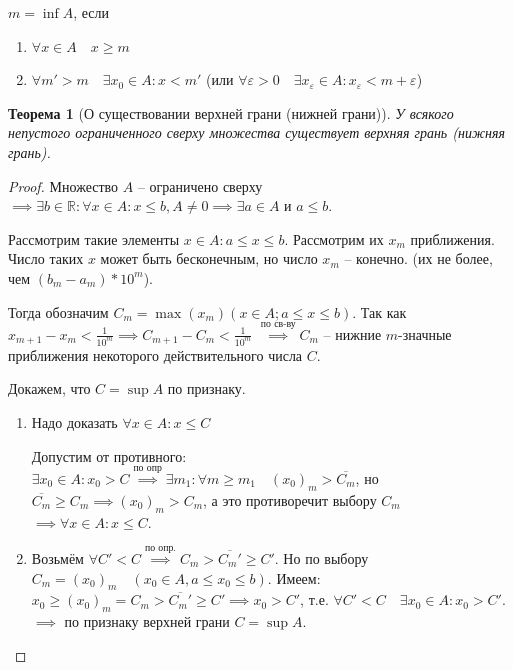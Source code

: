 \documentclass[a4paper,oneside]{article}
\newcommand{\bydef}{\stackrel{\text{по опр.}}{\implies}} %
\newtheorem{theorem}{Теорема}[subsection]
\begin{document}
$m = \inf A$, если 
\begin{enumerate}
    \item $\forall x \in A \quad x \ge m$
    \item $\forall m' > m \quad \exists x_0 \in A: x < m'$
    (или $\forall \varepsilon > 0 \quad \exists x_\varepsilon \in A: x_\varepsilon < m + \varepsilon$)
\end{enumerate}

\begin{theorem}[О существовании верхней грани (нижней грани)]
    У всякого непустого ограниченного сверху множества существует верхняя грань (нижняя грань).
\end{theorem}

\begin{proof}
    Множество $A$ -- ограничено сверху $\implies \exists b \in \mathbb{R}: \forall x \in A:
    x \le b, A \ne 0 \implies \exists a \in A$ и $a \le b$.

    Рассмотрим такие элементы $x \in A: a \le x \le b$. Рассмотрим их $x_m$ приближения.
    Число таких $x$ может быть бесконечным, но число $x_m$ -- конечно.
    (их не более, чем $(b_m - a_m) * 10^m$). 

    Тогда обозначим $C_m = \max (x_m) (x \in A; a \le x \le b)$.
    Так как $x_{m+1} - x_m < \frac{1}{10^m} \implies C_{m+1} - C_m < \frac{1}{10^m}$
    $\stackrel{\text{по св-ву}}{\implies} C_m$ -- нижние $m$-значные приближения некоторого 
    действительного числа $C$.

    Докажем, что $C = \sup A$ по признаку.
    \begin{enumerate}
        \item Надо доказать $\forall x \in A: x \le C$
        
        Допустим от противного: $\exists x_0 \in A: x_0 > C \stackrel{\text{по опр}}{\implies}
        \exists m_1: \forall m \ge m_1 \quad (x_0)_m > \overline{C_m}$, но
        $\overline{C_m} \ge C_m \implies (x_0)_m > C_m$, а это противоречит выбору $C_m$
        $\implies \forall x \in A: x \le C$.

        \item Возьмём $\forall C' < C \bydef C_m > \overline{C_m'} \ge C'$.
        Но по выбору $C_m = (x_0)_m \quad (x_0 \in A, a \le x_0 \le b)$.
        Имеем: $x_0 \ge (x_0)_m = C_m > \overline{C_m'} \ge C' \implies x_0 > C'$,
        т.е. $\forall C' < C \quad \exists x_0 \in A: x_0 > C'$.
        $\implies$ по признаку верхней грани $C = \sup A$.
    \end{enumerate}
\end{proof}
\end{document}

